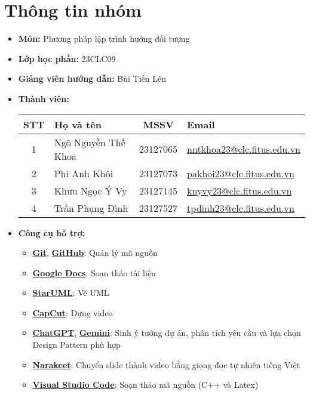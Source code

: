 \section{Thông tin nhóm}
\begin{itemize}
  \item \textbf{Môn:} Phương pháp lập trình hướng đối tượng
  \item \textbf{Lớp học phần:} 23CLC09
  \item \textbf{Giảng viên hướng dẫn:} Bùi Tiến Lên
  \item \textbf{Thành viên:}
        \begin{center}
          \renewcommand{\arraystretch}{1.5}
          \begin{tabular}{|c|l|c|l|}
            \hline
            \textbf{STT} & \textbf{Họ và tên}  & \textbf{MSSV} & \textbf{Email}                                                       \\\hline
            1            & Ngô Nguyễn Thế Khoa & 23127065      & \href{mailto:nntkhoa23@clc.fitus.edu.vn}{nntkhoa23@clc.fitus.edu.vn} \\\hline
            2            & Phi Anh Khôi        & 23127073      & \href{mailto:pakhoi23@clc.fitus.edu.vn}{pakhoi23@clc.fitus.edu.vn}   \\\hline
            3            & Khưu Ngọc Ý Vy      & 23127145      & \href{mailto:knyvy23@clc.fitus.edu.vn}{knyvy23@clc.fitus.edu.vn}     \\\hline
            4            & Trần Phụng Đình     & 23127527      & \href{mailto:tpdinh23@clc.fitus.edu.vn}{tpdinh23@clc.fitus.edu.vn}   \\\hline
          \end{tabular}
        \end{center}
  \item \textbf{Công cụ hỗ trợ:}
        \begin{itemize}
          \item \href{https://git-scm.com/}{\textbf{Git}}, \href{https://github.com/}{\textbf{GitHub}}: Quản lý mã nguồn
          \item \href{https://docs.google.com/docs/}{\textbf{Google Docs}}: Soạn thảo tài liệu
          \item \href{https://staruml.io/}{\textbf{StarUML}}: Vẽ UML
          \item \href{https://www.capcut.com/}{\textbf{CapCut}}: Dựng video
          \item \href{https://chatgpt.com/}{\textbf{ChatGPT}}, \href{https://gemini.google.com/}{\textbf{Gemini}}: Sinh ý tưởng dự án, phân tích yêu cầu và lựa chọn Design Pattern phù hợp
          \item \href{https://www.narakeet.com/app/presentation/?projectId=15b29ae0-0e29-4a72-a398-153bbca9b701}{\textbf{Narakeet}}: Chuyển slide thành video bằng giọng đọc tự nhiên tiếng Việt
          \item \href{https://code.visualstudio.com/}{\textbf{Visual Studio Code}}: Soạn thảo mã nguồn (C++ và Latex)
        \end{itemize}
\end{itemize}
